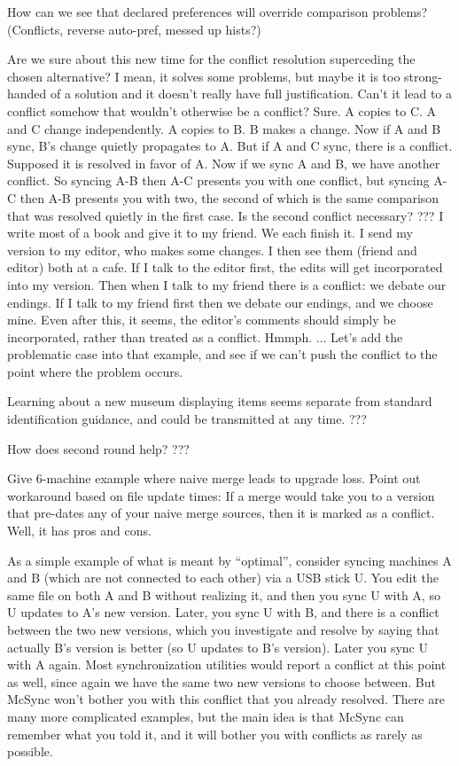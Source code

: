 \documentclass{book}
\begin{document}
How can we see that declared preferences will override comparison problems?  (Conflicts, reverse auto-pref, messed up hists?)

Are we sure about this new time for the conflict resolution superceding the chosen alternative?  I mean, it solves some problems, but maybe it is too strong-handed of a solution and it doesn't really have full justification.  Can't it lead to a conflict somehow that wouldn't otherwise be a conflict?
Sure. A copies to C.  A and C change independently. A copies to B.  B makes a change.  Now if A and B sync, B's change quietly propagates to A.  But if A and C sync, there is a conflict.  Supposed it is resolved in favor of A.  Now if we sync A and B, we have another conflict.  So syncing A-B then A-C presents you with one conflict, but syncing A-C then A-B presents you with two, the second of which is the same comparison that was resolved quietly in the first case.  Is the second conflict necessary?
???
I write most of a book and give it to my friend.  We each finish it.  I send my version to my editor, who makes some changes.  I then see them (friend and editor) both at a cafe.  If I talk to the editor first, the edits will get incorporated into my version.  Then when I talk to my friend there is a conflict: we debate our endings.  If I talk to my friend first then we debate our endings, and we choose mine.  Even after this, it seems, the editor's comments should simply be incorporated, rather than treated as a conflict.  Hmmph.
...
Let's add the problematic case into that example, and see if we can't push the conflict to the point where the problem occurs.

Learning about a new museum displaying items seems separate from standard identification guidance, and could be transmitted at any time.
???

How does second round help?
???

Give 6-machine example where naive merge leads to upgrade loss.
Point out workaround based on file update times: If a merge would take you to a version that pre-dates any of your naive merge sources, then it is marked as a conflict.  Well, it has pros and cons.

As a simple example of what is meant by ``optimal'', consider syncing machines A and B (which are not connected to each other) via a USB stick U.  You edit the same file on both A and B without realizing it, and then you sync U with A, so U updates to A's new version.  Later, you sync U with B, and there is a conflict between the two new versions, which you investigate and resolve by saying that actually B's version is better (so U updates to B's version).  Later you sync U with A again.  Most synchronization utilities would report a conflict at this point as well, since again we have the same two new versions to choose between.  But McSync won't bother you with this conflict that you already resolved.  There are many more complicated examples, but the main idea is that McSync can remember what you told it, and it will bother you with conflicts as rarely as possible.
\end{document}
